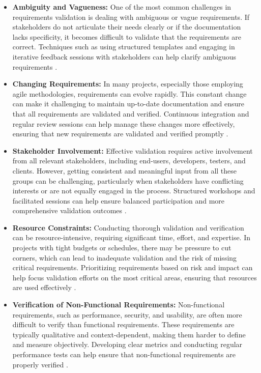 \begin{refsection}
\begin{itemize}
    \item \textbf{Ambiguity and Vagueness:} One of the most common challenges in requirements validation is dealing with ambiguous or vague requirements. If stakeholders do not articulate their needs clearly or if the documentation lacks specificity, it becomes difficult to validate that the requirements are correct. Techniques such as using structured templates and engaging in iterative feedback sessions with stakeholders can help clarify ambiguous requirements \cite[pp.~101-120]{pohl2010requirements}.

    \item \textbf{Changing Requirements:} In many projects, especially those employing agile methodologies, requirements can evolve rapidly. This constant change can make it challenging to maintain up-to-date documentation and ensure that all requirements are validated and verified. Continuous integration and regular review sessions can help manage these changes more effectively, ensuring that new requirements are validated and verified promptly \cite[pp.~200-220]{cockburn2007agile}.

    \item \textbf{Stakeholder Involvement:} Effective validation requires active involvement from all relevant stakeholders, including end-users, developers, testers, and clients. However, getting consistent and meaningful input from all these groups can be challenging, particularly when stakeholders have conflicting interests or are not equally engaged in the process. Structured workshops and facilitated sessions can help ensure balanced participation and more comprehensive validation outcomes \cite[pp.~160-180]{hull2018requirements}.

    \item \textbf{Resource Constraints:} Conducting thorough validation and verification can be resource-intensive, requiring significant time, effort, and expertise. In projects with tight budgets or schedules, there may be pressure to cut corners, which can lead to inadequate validation and the risk of missing critical requirements. Prioritizing requirements based on risk and impact can help focus validation efforts on the most critical areas, ensuring that resources are used effectively \cite[pp.~220-235]{wiegers2013software}.

    \item \textbf{Verification of Non-Functional Requirements:} Non-functional requirements, such as performance, security, and usability, are often more difficult to verify than functional requirements. These requirements are typically qualitative and context-dependent, making them harder to define and measure objectively. Developing clear metrics and conducting regular performance tests can help ensure that non-functional requirements are properly verified \cite[pp.~180-195]{chung2000nonfunctional}.
\end{itemize}


\end{refsection}
